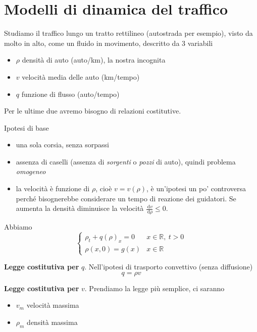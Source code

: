 \documentclass[10pt,a4paper,twoside,openright]{book}
\newcommand{\de}{\,\mathrm d}
\newcommand{\dv}{\de v}
\newcommand{\drho}{\de \rho}
\begin{document}
\section{Modelli di dinamica del traffico}

Studiamo il traffico lungo un tratto rettilineo (autostrada per esempio), visto da molto in alto, come un fluido in movimento, descritto da $3$ variabili
\begin{itemize}
	\item $\rho $ densità di auto (auto/km), la nostra incognita
	\item $v$ velocità media delle auto (km/tempo)
	\item $q$ funzione di flusso (auto/tempo)
\end{itemize}
Per le ultime due avremo bisogno di relazioni costitutive.

Ipotesi di base
\begin{itemize}
	\item una sola corsia, senza sorpassi
	\item assenza di caselli (assenza di \textit{sorgenti} o \textit{pozzi} di auto), quindi problema \emph{omogeneo}
	\item la velocità è funzione di $\rho $, cioè $v=v(\rho)$, è un'ipotesi un po' controversa perché bisognerebbe considerare un tempo di reazione dei guidatori. Se aumenta la densità diminuisce la velocità $\frac{\dv}{\drho} \leqslant 0$.
\end{itemize}

Abbiamo
\begin{equation}
	\begin{cases}
		\rho _{t} +q(\rho)_{x} =0 & x\in \mathbb{R} ,\ t >0 \\
		\rho (x,0) =g(x)          & x\in \mathbb{R}         
	\end{cases}
\end{equation}


\textbf{Legge costitutiva per} $q$.
Nell'ipotesi di trasporto convettivo (senza diffusione)
\begin{equation}
	q=\rho v
\end{equation}

\textbf{Legge costitutiva per} $v$.
Prendiamo la legge più semplice, ci saranno
\begin{itemize}
	\item $v_{m}$ velocità massima
	\item $\rho _{m}$ densità massima
\end{itemize}
\end{document}
